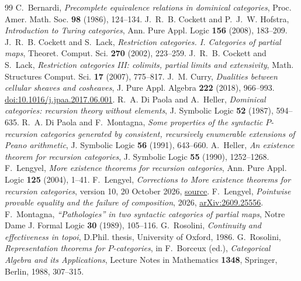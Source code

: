 \documentclass[11pt]{article}
\begin{document}
\begin{thebibliography}{99}
C.~Bernardi, \emph{Precomplete equivalence relations in dominical
categories}, Proc. Amer. Math. Soc. \textbf{98} (1986), 124--134.
J.~R.~B. Cockett and P.~J.~W. Hofstra,
\emph{Introduction to Turing categories},
Ann. Pure Appl. Logic \textbf{156} (2008), 183--209.
J.~R.~B. Cockett and S.~Lack, \emph{Restriction categories. I.
Categories of partial maps}, Theoret. Comput. Sci. \textbf{270}
(2002), 223--259.
J.~R.~B. Cockett and S.~Lack,
\emph{Restriction categories III: colimits, partial limits and extensivity},
Math. Structures Comput. Sci. \textbf{17} (2007), 775--817.
J.~M. Curry, \emph{Dualities between cellular sheaves and cosheaves},
J. Pure Appl. Algebra \textbf{222} (2018), 966--993.
\href{https://doi.org/10.1016/j.jpaa.2017.06.001}
{doi:10.1016/j.jpaa.2017.06.001}.
R.~A. Di Paola and A.~Heller, \emph{Dominical categories:
recursion theory without elements}, J. Symbolic Logic
\textbf{52} (1987), 594--635.
R.~A. Di Paola and F.~Montagna, \emph{Some properties of the syntactic
$P$-recursion categories generated by consistent, recursively enumerable
extensions of Peano arithmetic}, J. Symbolic Logic \textbf{56} (1991),
643--660.
A.~Heller, \emph{An existence theorem for recursion categories},
J. Symbolic Logic \textbf{55} (1990), 1252--1268.
F.~Lengyel, \emph{More existence theorems for recursion categories},
Ann. Pure Appl. Logic \textbf{125} (2004), 1--41.
F.~Lengyel, \emph{Corrections to More existence theorems for recursion
categories}, version 10, 20 October 2026,
\href{https://github.com/flengyel/errata/blob/5555e4fa1da7b8e3a0836dd1fbf1ca385cacd03b/lengyel2004/lengyel2004_repairs_v10.tex}{source}.
F.~Lengyel, \emph{Pointwise provable equality and the failure of
composition}, 2026,
\href{https://arxiv.org/abs/2609.25556}{arXiv:2609.25556}.
F.~Montagna, \emph{``Pathologies'' in two syntactic categories of partial
maps}, Notre Dame J. Formal Logic \textbf{30} (1989), 105--116.
G.~Rosolini, \emph{Continuity and effectiveness in topoi}, D.Phil.
thesis, University of Oxford, 1986.
G.~Rosolini, \emph{Representation theorems for $P$-categories},
in F.~Borceux (ed.), \emph{Categorical Algebra and its Applications},
Lecture Notes in Mathematics \textbf{1348}, Springer, Berlin, 1988,
307--315.
\end{thebibliography}
\end{document}
